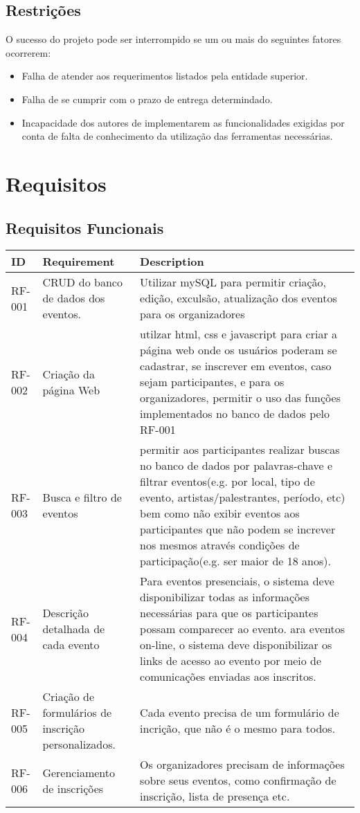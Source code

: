 \section{Restrições}
    O sucesso do projeto pode ser interrompido se um ou mais do seguintes fatores ocorrerem:
    \begin{itemize}
        \item Falha de atender aos requerimentos listados pela entidade superior.
        \item Falha de se cumprir com o prazo de entrega determindado.
        \item Incapacidade dos autores de implementarem as funcionalidades exigidas por conta de falta de conhecimento da utilização das ferramentas necessárias.
    \end{itemize}

\newpage

\chapter{Requisitos}
\label{Requisitos}

\section{Requisitos Funcionais}

\begin{tabular}{>{\raggedright}p{1.5cm}>{\raggedright}p{4cm}>{\raggedright}p{10cm}}
\toprule
\textbf{ID} & \textbf{Requirement} & \textbf{Description} \tabularnewline 
\midrule
RF-001 & CRUD do banco de dados dos eventos. & Utilizar mySQL para permitir criação, edição, exculsão, atualização dos eventos para os organizadores \tabularnewline \hline
RF-002 & Criação da página Web & utilzar html, css e javascript para criar a página web onde os usuários poderam se cadastrar, se inscrever em eventos,  caso sejam participantes, e para os organizadores, permitir o uso das funções implementados no banco de dados pelo RF-001 \tabularnewline \hline
RF-003 & Busca e filtro de eventos & permitir aos participantes realizar buscas no banco de dados por palavras-chave e filtrar eventos(e.g. por local, tipo de evento, artistas/palestrantes, período, etc) bem como não exibir eventos aos participantes que não podem se increver nos mesmos através condições de participação(e.g. ser maior de 18 anos). \tabularnewline \hline
RF-004 & Descrição detalhada de cada evento & Para eventos presenciais, o sistema deve disponibilizar todas as informações necessárias para que os participantes possam comparecer ao evento. ara eventos on-line, o sistema deve disponibilizar os links de acesso ao evento por meio de comunicações enviadas aos inscritos. \tabularnewline \hline
RF-005 & Criação de formulários de inscrição personalizados. & Cada evento precisa de um formulário de incrição, que não é o mesmo para todos. \tabularnewline \hline
RF-006 & Gerenciamento de inscrições & Os organizadores precisam de informações sobre seus eventos, como conﬁrmação de inscrição, lista de presença etc. \tabularnewline
\bottomrule
\end{tabular}


